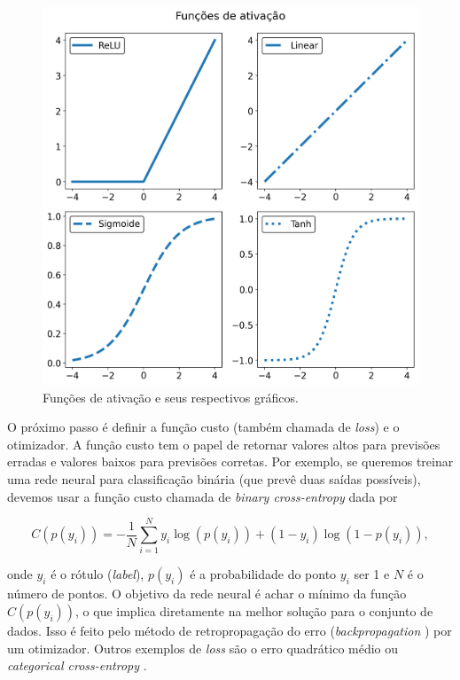 \documentclass[a4paper,12pt,oneside]{book}
\begin{document}
\begin{figure}[H]
    \centering
    \includegraphics[scale = 0.7]{figs/ativacoes.png}
    \caption{Funções de ativação e seus respectivos gráficos.}
    \label{fig:ativacoes}
\end{figure}

\par O próximo passo é definir a função custo (também chamada de \textit{loss}) e o otimizador. A função custo tem o papel de retornar valores altos para previsões erradas e valores baixos para previsões corretas. Por exemplo, se queremos treinar uma rede neural para classificação binária (que prevê duas saídas possíveis), devemos usar a função custo chamada de \textit{binary cross-entropy} dada por\cite{dl_book}

\begin{equation}\label{eq:binary_cross_entropy}
    C(p(y_i)) = -\frac{1}{N}\sum_{i = 1} ^N y_i \log(p(y_i)) + (1 - y_i)\log(1 - p(y_i)),
\end{equation}

\par onde $y_i$ é o rótulo (\textit{label}), $p(y_i)$ é a probabilidade do ponto $y_i$ ser 1 e $N$ é o número de pontos. O objetivo da rede neural é achar o mínimo da função $C(p(y_i))$, o que implica diretamente na melhor solução para o conjunto de dados. Isso é feito pelo método de retropropagação do erro (\textit{backpropagation} \cite{backpropagation}) por um otimizador. Outros exemplos de \textit{loss} são o erro quadrático médio ou \textit{categorical cross-entropy} \cite{MSE_CEF_review}.
\end{document}
